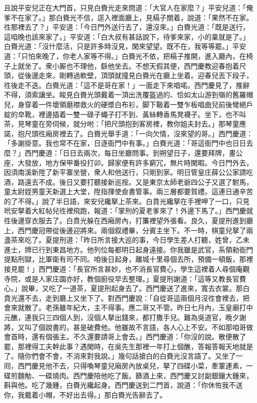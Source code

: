 且說平安兒正在大門首，只見白賚光走來問道：「大官人在家麼？」平安兒道：「俺爹不在家了。」那白賚光不信，逕入裡面廳上，{}見槅子關着，說道：「果然不在家。徃那裡去了？」平安道：「今日門外送行去了，還沒來。」白賚光道：「既是送行，這咱晚也該來家了。」平安道：「白大叔有甚話說下，待爹來家，小的稟就是了。」白賚光道：「沒什麼活，只是許多時沒見，閑來望望。既不在，我等等罷。」{}平安道：「只怕來晚了，你老人家等不得。」白賚光不依，把槅子推開，進入廳內，在椅子上就坐了。衆小厮也不理他，繇他坐去。不想天假其便，西門慶教迎春抱着尺頭，從後邊走來，剛轉過軟壁，頂頭就撞見白賚光在廳上坐着。迎春兒丟下段子，徃後走不迭。白賚光道：「這不是哥在家！」一面走下來唱喏。西門慶見了，推辭不得，須索讓坐。睃見白賚光頭戴着一頂出洗覆盔過的、恰如太山游到嶺的舊羅帽兒，{}身穿着一件壞領磨襟救火的硬漿白布衫，脚下靸着一雙乍板唱曲兒前後彎絕戶綻的皁靴，{}裡邊插着一雙一碌子蠅子打不到、黃絲轉香馬凳襪子。坐下，也不叫茶，見琴童在旁伺候，就分咐：「把尺頭抱到客房裡，教你姐夫封去。」那琴童應諾，抱尺頭徃廂房裡去了。白賚光舉手道：「一向欠情，沒來望的哥。」西門慶道：「多謝掛意。我也常不在家，日逐衙門中有事。」白賚光道：「哥這衙門中也日日去麼？」西門慶道：「日日去兩次，每日坐廳問事。到朔望日子，還要拜牌，畫公座，大發放，地方保甲番役打卯。歸家便有許多窮冗，無片時閑暇。今日門外去，因須南溪新陞了新平寨坐營，衆人和他送行，只剛到家。明日管皇庄薛公公家請吃酒，路遠去不成。後日又要打聽接新巡按。又是東京太師老爺四公子又選了駙馬，童太尉姪男童天新選上大堂，陞指揮使僉書管事。兩三層都要賀禮。這連日通辛苦的了不得。」說了半日語，來安兒纔拏上茶來。白賁光纔拏在手裡呷了一口，只見玳安拏着大紅帖兒徃裡飛跑，報道：「掌刑的夏老爹來了！外邊下馬了。」西門慶就徃後邊穿衣服去了。白賁光躲在西廂房內，打簾裡望外張看。良久，夏提刑進到廳上，西門慶冠帶從後邊迎將來。兩個叙禮畢，分賓主坐下。不一時，棋童兒拏了兩盞茶來吃了。夏提刑道：「昨日所言接大巡的事，今日學生差人打聽，姓曾，乙未進士，牌已行到東昌地方。他列位每都明日起身遠接。你我雖是武官，系領勑衙門提點刑獄，比軍衛有司不同。咱後日起身，離城十里尋個去所，預備一頓飯，那裡接見罷！」{}西門慶道：「長官所言甚妙，也不消長官費心，學生這裡着人尋個庵觀寺院，或是人家庄園亦好，教個廚役早去整理。」夏提刑謝道：「這等又教長官費心。」說畢，又吃了一道茶，夏提刑起身去了。西門慶送了進來，寬去衣裳。那白賁光還不去，走到廳上又坐下了。對西門慶說：「自從哥這兩個月沒徃會裡去，把會來就散了。老孫雖年紀大，主不得事。應二哥又不管。昨日七月內，玉皇廟打中元醮，連我只三四個人到，沒個人拏出錢來，都打撒手兒。{}難為吳道官，晚夕謝將，又叫了個說書的，甚是破費他。他雖故不言語，各人心上不安。不如那咱哥做會首時，還有個張主。不久還要請哥上會去。」西門慶道：「你沒的說。散便散了罷，那裡得工夫幹此事？遇閑時，在吳先生那裡一年打上個醮，答報答報天地就是了。隨你們會不會，不消來對我說。」幾句話搶白的白賚光沒言語了。又坐了一囘，西門慶見他不去，只得喚琴童兒廂房內放桌兒，拏了四碟小菜，牽葷連素，一碟煎麵觔、一碟燒肉。{}西門慶陪他吃了飯。篩酒上來，西門慶又討副銀鑲大鍾來，斟與他。吃了幾鍾，白賚光纔起身。西門慶送到二門首，說道：「你休恠我不送你，我戴着小帽，不好出去得。」那白賚光告辭去了。

